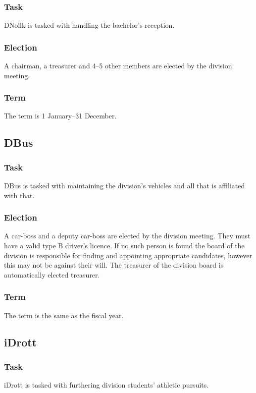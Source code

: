 \subsubsection{Task}
DNollk is tasked with handling the bachelor's reception. 

\subsubsection{Election}
A chairman, a treasurer and 4--5 other members are elected by the division meeting. 

\subsubsection{Term}
The term is 1 January--31 December.

\subsection{DBus}

\subsubsection{Task}
DBus is tasked with maintaining the division's vehicles and all that is affiliated with that. 

\subsubsection{Election}
A car-boss and a deputy car-boss are elected by the division meeting. They must have a valid type B driver's licence. If no such person is found the board of the division is responsible for finding and appointing appropriate candidates, however this may not be against their will. The treasurer of the division board is automatically elected treasurer.

\subsubsection{Term}
The term is the same as the fiscal year. 

\subsection{iDrott}

\subsubsection{Task}
iDrott is tasked with furthering division students' athletic pursuits. 

